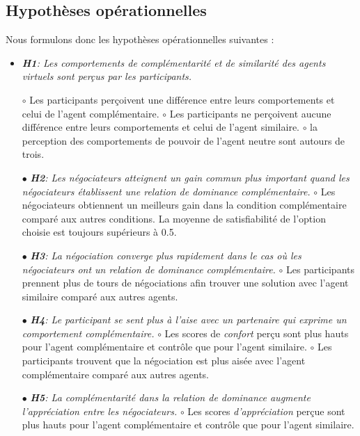 	\subsection{Hypothèses opérationnelles}
		Nous formulons donc les hypothèses opérationnelles suivantes :
		\begin{itemize}
			\item\textit{\textbf{H1}: Les comportements de complémentarité et de similarité des agents virtuels sont perçus par les participants.}
				
				\subitem $\circ$  Les participants perçoivent une différence entre leurs comportements et celui de l'agent complémentaire.
				\subitem $\circ$ Les participants ne perçoivent aucune différence entre leurs comportements et celui de l'agent similaire.
				\subitem $\circ$ la perception des comportements de pouvoir de l'agent neutre sont autours de trois. 
			\item [$\bullet$]\textit{ \textbf{H2}: Les négociateurs atteignent un gain commun plus important quand les négociateurs établissent une relation de dominance complémentaire.}
				\subitem $\circ$ Les négociateurs obtiennent un meilleurs gain dans la condition complémentaire comparé aux autres conditions. La moyenne de satisfiabilité de l'option choisie est toujours supérieurs à 0.5. 
				 
			\item [$\bullet$] \textit{\textbf{H3}: La négociation converge plus rapidement dans le cas où les négociateurs ont un relation de dominance complémentaire.}
				\subitem $\circ$ Les participants prennent plus de tours de négociations afin trouver une solution avec l'agent similaire comparé aux autres agents.


			\item [$\bullet$] \textit{\textbf{H4}: Le participant se sent plus à l'aise avec un partenaire qui exprime un comportement complémentaire.}
				\subitem $\circ$ Les scores de \emph{confort} perçu sont plus hauts pour l'agent complémentaire et contrôle que pour l'agent similaire.
				\subitem $\circ$ Les participants trouvent que la négociation est plus aisée avec l'agent complémentaire comparé aux autres agents.
			\item [$\bullet$] \textit{\textbf{H5}: La complémentarité dans la relation de dominance augmente l'appréciation entre les négociateurs.}
				\subitem $\circ$ Les scores \emph{d'appréciation} perçue sont plus hauts pour l'agent complémentaire et contrôle que pour l'agent similaire.
			
		\end{itemize}


